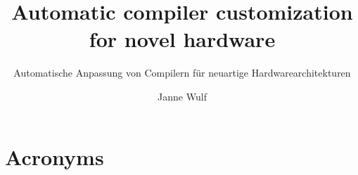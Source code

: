 \documentclass[
	ruledheaders=section,%
	class=report,%
	thesis={type=master},%
	accentcolor=9c,%
	custommargins=true,%
	marginpar=false,%
	parskip=half-,%
	fontsize=11pt,%
	logofile=img/tuda_logo, %
]{tudapub}
\begin{document}

\title{Automatic compiler customization for novel hardware}
\subtitle{Automatische Anpassung von Compilern für neuartige Hardwarearchitekturen}
\author[J. Wulf]{Janne Wulf}%


\examdate{\today}


\maketitle

\affidavit%

\tableofcontents

\listoftodos







\chapter*{Acronyms}


\printbibliography
\end{document}
